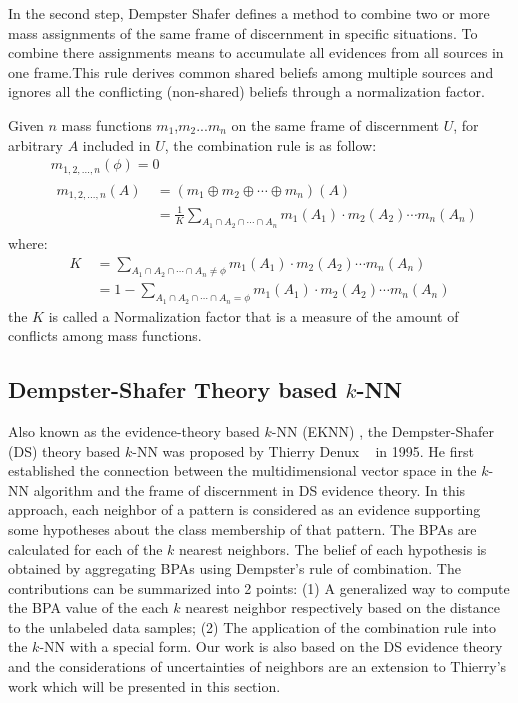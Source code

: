 \documentclass[runningheads]{llncs}
\begin{document}
In the second step, Dempster Shafer defines a method to combine two or more mass assignments of the same frame of discernment in specific situations. To combine there assignments means to accumulate all evidences from all sources in one frame.This rule derives common shared beliefs among multiple sources and ignores all the conflicting (non-shared) beliefs through a normalization factor. 

Given $n$ mass functions $m_1$,$m_2$...$m_n$ on the same frame of discernment $U$, for arbitrary $A$  included in $U$, the combination rule is as follow:
\begin{equation}
\begin{split}
&\ m_{1,2,...,n}(\phi) = 0\\
&\ 
\begin{split}
m_{1,2,...,n}(A)  &\ =(m_1\oplus m_2 \oplus \cdots 
\oplus m_n)(A) \\
&\ = \frac{1}{K} \sum_{A_1 \cap A_2 \cap \cdots
\cap A_n} m_1(A_1) \cdot m_2(A_2) \cdots m_n(A_n)
\end{split}
\end{split}
\end{equation}
where:
\begin{equation}
\begin{split}
K &\ = \sum_{A_1 \cap A_2 \cap \cdots
\cap A_n \ne \phi} m_1(A_1) \cdot m_2(A_2) \cdots m_n(A_n) \\
&\ = 1 - \sum_{A_1 \cap A_2 \cap \cdots
\cap A_n = \phi} m_1(A_1) \cdot m_2(A_2) \cdots m_n(A_n) 
\end{split}
\end{equation}
the $K$ is called a Normalization factor that is a measure of the amount of conflicts among mass functions. 

\subsection{Dempster-Shafer Theory based $k$-NN}

Also known as the evidence-theory based $k$-NN (EKNN) , the Dempster-Shafer (DS) theory based $k$-NN was proposed by Thierry Denux ~\cite{ref_article3} in 1995. He first established the connection between the multidimensional vector space in the $k$-NN algorithm and the frame of discernment in DS evidence theory. In this approach, each neighbor of a pattern is considered as an evidence supporting some hypotheses about the class membership of that pattern. The BPAs are calculated for each of the $k$ nearest neighbors. The belief of each hypothesis is obtained by aggregating BPAs using Dempster’s rule of combination. The contributions can be summarized into 2 points: (1) A generalized way to compute the BPA value of the each $k$ nearest neighbor respectively based on the distance to the unlabeled data samples; (2) The application of the combination rule into the $k$-NN with a special form. Our work is also based on the DS evidence theory and the considerations of uncertainties of neighbors are an extension to Thierry's work which will be presented in this section.
\end{document}
